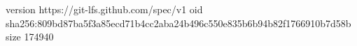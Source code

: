 version https://git-lfs.github.com/spec/v1
oid sha256:809bd87ba5f3a85ecd71b4cc2aba24b496c550e835b6b94b82f1766910b7d58b
size 174940
